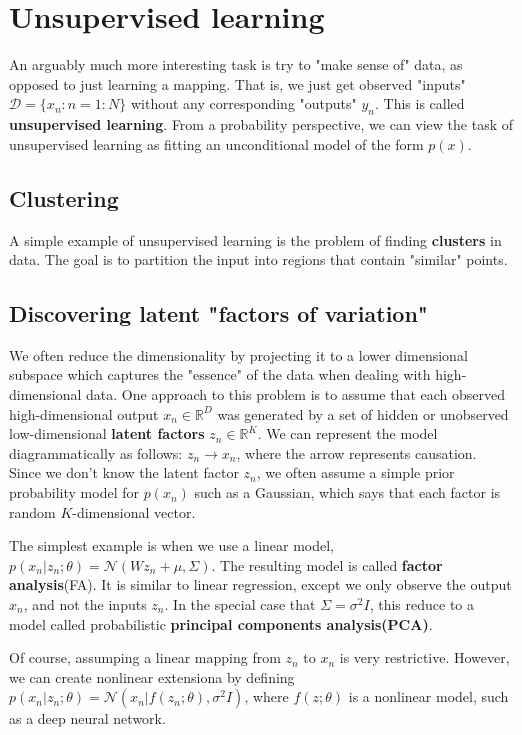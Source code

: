 \section{Unsupervised learning}
An arguably much more interesting task is try to "make sense of" data, as opposed to just learning a mapping. That is, we just get observed "inputs" $\mathcal{D} = \{x_n:n=1:N\}$ without any corresponding "outputs" $y_n$. This is called \textbf{unsupervised learning}. From a probability perspective, we can  view the task of unsupervised learning as fitting an unconditional model of the form $p(x)$.
\subsection{Clustering}
A simple example of unsupervised learning is the problem of finding \textbf{clusters} in data. The goal is to partition the input into regions that contain "similar" points.
 \subsection{Discovering latent "factors of variation"}
 We often reduce the dimensionality by projecting it to a lower dimensional subspace which captures the "essence" of the data when dealing with high-dimensional data. One approach to this problem is to assume that each observed high-dimensional output $x_n \in \mathbb{R}^D$ was generated by a set of hidden or unobserved low-dimensional \textbf{latent factors} $z_n \in \mathbb{R}^K$. We can represent the model diagrammatically as follows: $z_n \rightarrow x_n$, where the arrow represents causation. Since we don't know the latent factor $z_n$, we often assume a simple prior probability model for $p(x_n)$ such as a Gaussian, which says that each factor is random $K$-dimensional vector.
 \par
 The simplest example is when we use a linear model, $p(x_n|z_n;\theta) = \mathcal{N}(Wz_n+\mu, \Sigma)$. The resulting model is called \textbf{factor analysis}(FA). It is similar to linear regression, except we only observe the output $x_n$, and not the inputs $z_n$. In the special case that $\Sigma = \sigma^2I$, this reduce to a model called probabilistic \textbf{principal components analysis(PCA)}. 
\par
Of course, assumping a linear mapping from $z_n$ to $x_n$ is very restrictive. However, we can create nonlinear extensiona by defining $p(x_n|z_n;\theta) = \mathcal{N}(x_n|f(z_n;\theta), \sigma^2I)$, where $f(z;\theta)$ is a nonlinear model, such as a deep neural network.
